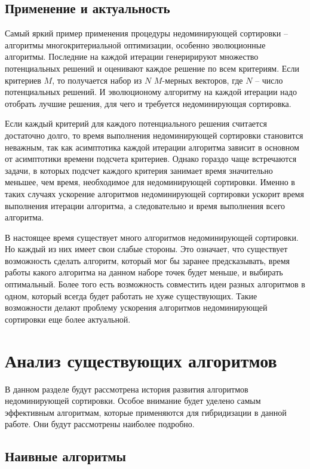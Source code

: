 \subsection{Применение и актуальность}

Самый яркий пример применения процедуры недоминирующей сортировки -- алгоритмы многокритериальной оптимизации, особенно
эволюционные алгоритмы. Последние на каждой итерации генеририруют множество потенциальных решений и оценивают каждое 
решение по всем критериям. Если критериев $M$, то получается набор из $N$ $M$-мерных векторов, где $N$ -- число потенциальных 
решений. И эволюционому алгоритму на каждой итерации надо отобрать лучшие решения, для чего и требуется недоминирующая
сортировка.

Если каждый критерий для каждого потенциального решения считается достаточно долго, то время выполнения недоминирующей
сортировки становится неважным, так как асимптотика каждой итерации алгоритма зависит в основном от асимптотики времени 
подсчета критериев. Однако гораздо чаще встречаются задачи, в которых подсчет каждого критерия занимает время значительно 
меньшее, чем время, необходимое для недоминирующей сортировки. Именно в таких случаях ускорение алгоритмов недоминирующей
сортировки ускорит время выполнения итерации алгоритма, а следовательно и время выполнения всего алгоритма.

В настоящее время существует много алгоритмов недоминирующей сортировки. Но каждый из них имеет свои слабые стороны. Это 
означает, что существует возможность сделать алгоритм, который мог бы заранее предсказывать, время работы какого алгоритма 
на данном наборе точек будет меньше, и выбирать оптимальный. Более того есть возможность совместить идеи разных алгоритмов
в одном, который всегда будет работать не хуже существующих. Такие возможности делают проблему ускорения алгоритмов недоминирующей
сортировки еще более актуальной.

\section{Анализ существующих алгоритмов}

В данном разделе будут рассмотрена история развития алгоритмов недоминирующей сортировки. Особое внимание будет
уделено самым эффективным алгоритмам, которые применяются для гибридизации в данной работе. Они будут рассмотрены 
наиболее подробно.

\subsection{Наивные алгоритмы}

